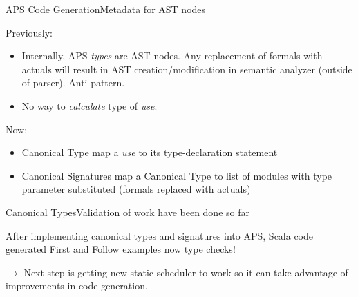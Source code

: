 \begin{frame}[fragile=singleslide]{APS Code Generation}{Metadata for AST nodes}

Previously:

\begin{itemize}
    \item Internally, APS \emph{types} are AST nodes. Any replacement of formals with actuals will result in AST creation/modification in semantic analyzer (outside of parser). \alert{Anti-pattern}.
    \item No way to \emph{calculate} type of \emph{use}.
\end{itemize}

Now:

\begin{itemize}
    \item \alert{Canonical Type} map a \emph{use} to its type-declaration statement
    \item \alert{Canonical Signatures} map a \alert{Canonical Type} to list of modules with type parameter \alert{substituted} (formals replaced with actuals)
\end{itemize}

\end{frame}




\begin{frame}{Canonical Types}{Validation of work have been done so far}
    
After implementing canonical types and signatures into APS, Scala code generated First and Follow examples \alert{now type checks}!

\newlinevspace

$\to$ Next step is getting new \alert{static scheduler} to work so it can take advantage of improvements in code generation.

\end{frame}

